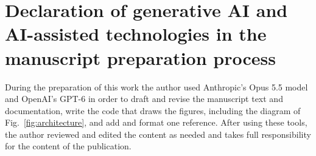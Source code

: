 \section*{Declaration of generative AI and AI-assisted technologies in the manuscript preparation process}
During the preparation of this work the author used Anthropic's Opus 5.5 model and OpenAI's GPT-6 in order to draft and revise the manuscript text and documentation, write the code that draws the figures, including the diagram of Fig.~\ref{fig:architecture}, and add and format one reference. After using these tools, the author reviewed and edited the content as needed and takes full responsibility for the content of the publication.
